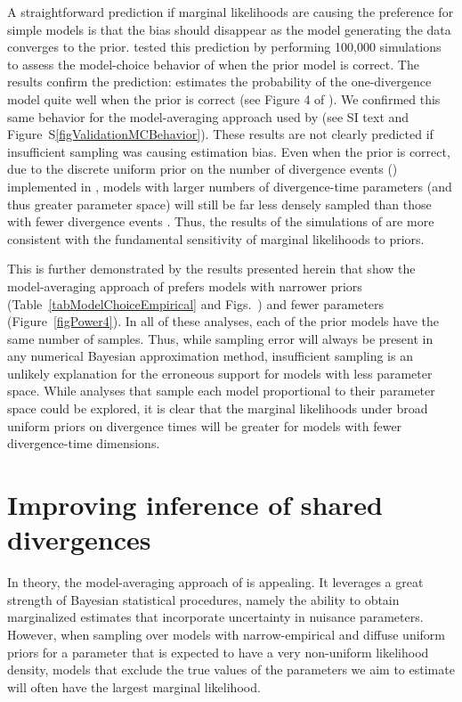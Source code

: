 A straightforward prediction if marginal likelihoods are causing the preference
for simple models is that the bias should disappear as the model generating the
data converges to the prior.
\citet{Oaks2012} tested this prediction by performing 100,000 simulations to
assess the model-choice behavior of \msb when the prior model is correct.
The results confirm the prediction:
\msb estimates the probability of the one-divergence model quite well when the
prior is correct (see Figure 4 of \citet{Oaks2012}).
We confirmed this same behavior for the model-averaging approach used by
\citet{Hickerson2013} (see SI text and Figure~S\ref{figValidationMCBehavior}).
These results are not clearly predicted if insufficient sampling was causing
estimation bias.
Even when the prior is correct, due to the discrete uniform prior on the number
of divergence events (\numt{}) implemented in \msb, models with larger numbers
of divergence-time parameters (and thus greater parameter space) will still be
far less densely sampled than those with fewer divergence events
\citep{Oaks2012}.
Thus, the results of the simulations of \citet{Oaks2012} are more consistent
with the fundamental sensitivity of marginal likelihoods to priors.

This is further demonstrated by the results presented herein that show the
model-averaging approach of \citet{Hickerson2013} prefers models with narrower
\divt{} priors (Table~\ref{tabModelChoiceEmpirical} and
Figs.~)
and fewer \divt{} parameters (Figure~\ref{figPower4}).
In all of these analyses, each of the prior models have the same number of
samples.
Thus, while sampling error will always be present in any numerical Bayesian
approximation method, insufficient sampling is an unlikely explanation for the
erroneous support for models with less parameter space.
While analyses that sample each model proportional to their parameter space
could be explored, it is clear that the marginal likelihoods under broad
uniform priors on divergence times will be greater for models with fewer
divergence-time dimensions.




\section{Improving inference of shared divergences}
In theory, the model-averaging approach of \citet{Hickerson2013} is appealing.
It leverages a great strength of Bayesian statistical procedures, namely the
ability to obtain marginalized estimates that incorporate uncertainty in
nuisance parameters.
However, when sampling over models with narrow-empirical and diffuse uniform
priors for a parameter that is expected to have a very non-uniform likelihood
density, models that exclude the true values of the parameters we aim to
estimate will often have the largest marginal likelihood.

